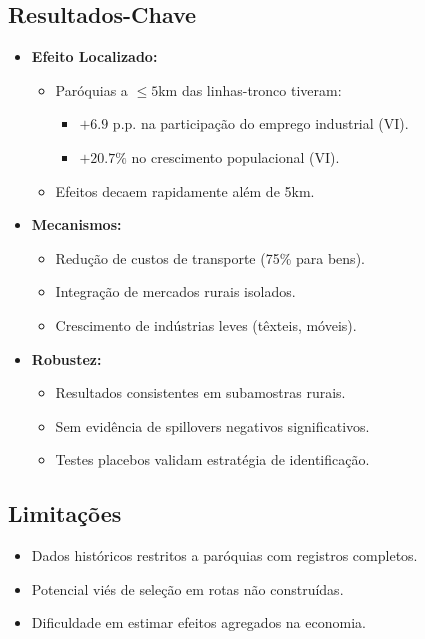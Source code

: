 \documentclass[12pt]{article}
\begin{document}
\subsection*{Resultados-Chave}
\begin{itemize}[leftmargin=*]
    \item \textbf{Efeito Localizado:}
    \begin{itemize}
        \item Paróquias a $\leq 5$km das linhas-tronco tiveram:
        \begin{itemize}
            \item $+6.9$ p.p. na participação do emprego industrial (VI).
            \item $+20.7\%$ no crescimento populacional (VI).
        \end{itemize}
        \item Efeitos decaem rapidamente além de 5km.
    \end{itemize}
    
    \item \textbf{Mecanismos:}
    \begin{itemize}
        \item Redução de custos de transporte (75\% para bens).
        \item Integração de mercados rurais isolados.
        \item Crescimento de indústrias leves (têxteis, móveis).
    \end{itemize}
    
    \item \textbf{Robustez:}
    \begin{itemize}
        \item Resultados consistentes em subamostras rurais.
        \item Sem evidência de spillovers negativos significativos.
        \item Testes placebos validam estratégia de identificação.
    \end{itemize}
\end{itemize}

\subsection*{Limitações}
\begin{itemize}[leftmargin=*]
    \item Dados históricos restritos a paróquias com registros completos.
    \item Potencial viés de seleção em rotas não construídas.
    \item Dificuldade em estimar efeitos agregados na economia.
\end{itemize}
\end{document}
